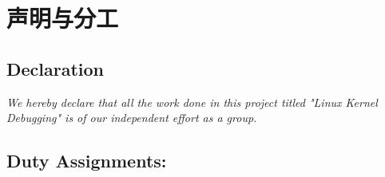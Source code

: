 \chapter{声明与分工}
	\section*{Declaration}
	\textit{We hereby declare that all the work done in this project titled
		"Linux Kernel Debugging" is of our independent effort as a group.}	
	\vspace{20pt}
	\section*{Duty Assignments:}
